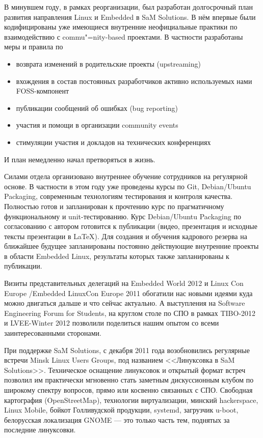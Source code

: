 \documentclass[10pt, a5paper]{article}
\begin{document}
В минувшем году, в рамках реорганизации, был разработан долгосрочный план развития направления Linux и Embedded в SaM Solutions. В нём впервые были кодифицированы уже имеющиеся внутренние неофициальные практики по взаимодействию с commu"=nity-based проектами. В частности разработаны меры и правила по
\begin{itemize}
  \item возврата изменений в родительские проекты (upstreaming)
  \item вхождения в состав постоянных разработчиков активно используемых нами FOSS-компонент
  \item публикации сообщений об ошибках (bug reporting)
  \item участия и помощи в организации community events
  \item стимуляции участия и докладов на технических конференциях
\end{itemize}
И план немедленно начал претворяться в жизнь.

Силами отдела организовано внутреннее обучение сотрудников на регулярной основе. В частности в этом году уже проведены курсы по Git, Debian/Ubuntu Packaging, современным технологиям тестирования и контроля качества. Полностью готов и запланирован к прочтению курс по прагматичному функциональному и unit-тестированию.  Курс Debian/Ubuntu Packaging по согласованию с автором готовится к публикации (видео, презентация и исходные тексты презентации в \LaTeX). Для создания и обучения кадрового резерва на ближайшее будущее запланированы постоянно действующие внутренние проекты в области Embedded Linux, результаты которых также запланированы к публикации.

Визиты представительных делегаций на Embedded World 2012 и Linux Con Europe /Embedded LinuxCon Europe 2011 обогатили нас новыми идеями куда можно двигаться дальше и что сейчас актуально. А выступления на Software Engineering Forum for Students, на круглом столе по СПО в рамках TIBO-2012 и LVEE-Winter 2012 позволили поделиться нашим опытом со всеми заинтересованными сторонами.

При поддержке SaM Solutions, с декабря 2011 года возобновились регулярные встречи Minsk Linux Users Groups, под названием <<Линуксовка в SaM Solutions>>. Техническое оснащение линуксовок и открытый формат встреч позволил им практически мгновенно стать заметным дискуссионным клубом по широкому спектру вопросов, прямо или косвенно связанных с СПО. Свободная картография (OpenStreetMap), технологии виртуализации, минский \linebreak hackerspace, Linux Mobile, бойкот Голливудской продукции, systemd, загрузчик u-boot, белорусская локализация GNOME --- это только часть тем, поднятых за последние линуксовки.
\end{document}

